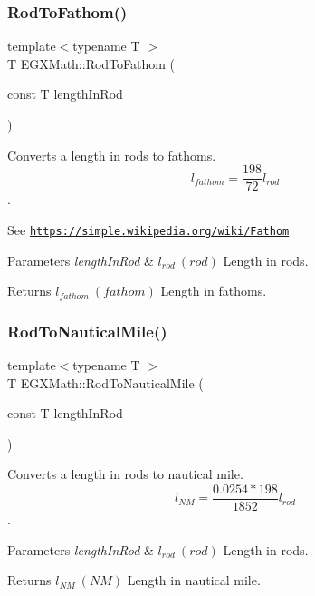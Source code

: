 \subsubsection{\texorpdfstring{Rod\+To\+Fathom()}{RodToFathom()}}
{\footnotesize\ttfamily template$<$typename T $>$ \\
T E\+G\+X\+Math\+::\+Rod\+To\+Fathom (\begin{DoxyParamCaption}\item[{const T}]{length\+In\+Rod }\end{DoxyParamCaption})}



Converts a length in rods to fathoms. \[ l_{fathom}= \frac{198}{72} l_{rod} \]. 

See \href{https://simple.wikipedia.org/wiki/Fathom}{\tt https\+://simple.\+wikipedia.\+org/wiki/\+Fathom} 
\begin{DoxyParams}{Parameters}
{\em length\+In\+Rod} & $ l_{rod}\ (rod)$ Length in rods. \\
\hline
\end{DoxyParams}
\begin{DoxyReturn}{Returns}
$ l_{fathom}\ (fathom)$ Length in fathoms. 
\end{DoxyReturn}
\mbox{\label{group___e_g_x_math-_conversions-_length_conversions-_surveyors-_rod-_nautical_ga68825640131c61e55490acfcb616aa78}} 
\subsubsection{\texorpdfstring{Rod\+To\+Nautical\+Mile()}{RodToNauticalMile()}}
{\footnotesize\ttfamily template$<$typename T $>$ \\
T E\+G\+X\+Math\+::\+Rod\+To\+Nautical\+Mile (\begin{DoxyParamCaption}\item[{const T}]{length\+In\+Rod }\end{DoxyParamCaption})}



Converts a length in rods to nautical mile. \[ l_{NM}= \frac{0.0254 * 198}{1852} l_{rod} \]. 


\begin{DoxyParams}{Parameters}
{\em length\+In\+Rod} & $ l_{rod}\ (rod)$ Length in rods. \\
\hline
\end{DoxyParams}
\begin{DoxyReturn}{Returns}
$ l_{NM}\ (NM)$ Length in nautical mile. 
\end{DoxyReturn}
